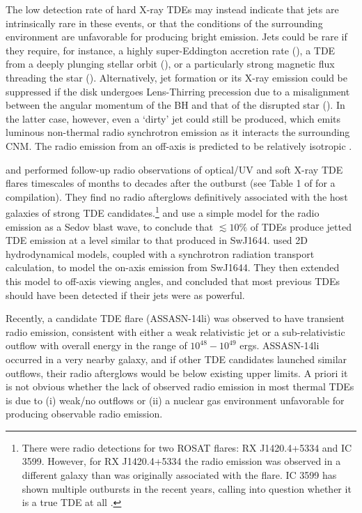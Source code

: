 \documentclass[usenatbib,fleqn]{mnras}
\begin{document}
The low detection rate of hard X-ray TDEs may instead indicate that
jets are intrinsically rare in these events, or that the conditions of the
surrounding environment are unfavorable for producing bright emission.
Jets could be rare if they require, for instance, a highly
super-Eddington accretion rate (\citealt{De-Colle+2012}), a TDE from a
deeply plunging stellar orbit (\citealt{Metzger&Stone2015}), or a
particularly strong magnetic flux threading the star
(\citealt{Tchekhovskoy+2014,Kelley+2014}).  Alternatively, jet formation
or its X-ray emission could be suppressed if the disk undergoes
Lens-Thirring precession due to a misalignment between the angular
momentum of the BH and that of the disrupted star
(\citealt{Stone&Loeb2012}).  In the latter case, however, even a `dirty'
jet could still be produced, which emits luminous non-thermal radio
synchrotron emission as it interacts the surrounding CNM.  The radio
emission from an off-axis is predicted to be relatively isotropic
\citep{Giannios&Metzger2011,Mimica+2015}.

\citet{Bower+2013} and \citet{van-Velzen+2013} performed follow-up
radio observations of optical/UV and soft X-ray TDE flares timescales
of months to decades after the outburst (see Table 1 of
\citealt{Mimica+2015} for a compilation). They find no radio afterglows
definitively associated with the host galaxies of strong TDE
candidates.\footnote{There were radio detections for two ROSAT flares:
  RX J1420.4+5334 and IC 3599. However, for RX J1420.4+5334 the radio
  emission was observed in a different galaxy than was originally
  associated with the flare.  IC 3599 has shown multiple outbursts in
  the recent years, calling into question whether it is a true TDE at all
  \citep{Campana+2015}.}  \citet{Bower+2013} and
\citet{van-Velzen+2013} use a simple model for the radio emission as a
Sedov blast wave, to conclude that $\lesssim 10\%$ of TDEs produce
jetted TDE emission at a level similar to that produced in SwJ1644.  \citet{Mimica+2015} used 2D hydrodynamical models, coupled
with a synchrotron radiation transport calculation, to model the
on-axis emission from SwJ1644. They then extended this
model to off-axis viewing angles, and concluded that most previous
TDEs should have been detected if their jets were as powerful. 

Recently, a candidate TDE flare (ASSASN-14li) was observed to
have transient radio emission, consistent with either a weak
relativistic jet \citep{van-Velzen+2015} or a sub-relativistic outflow
\citep{Alexander+2015} with overall energy in the range of
$10^{48}-10^{49}$ ergs.  ASSASN-14li occurred in a very nearby galaxy,
and if other TDE candidates launched similar outflows, their radio
afterglows would be below existing upper limits. A priori it
is not obvious whether the lack of observed radio emission in most
thermal TDEs is due to (i) weak/no outflows or (ii) a nuclear gas
environment unfavorable for producing observable radio emission.
\end{document}
